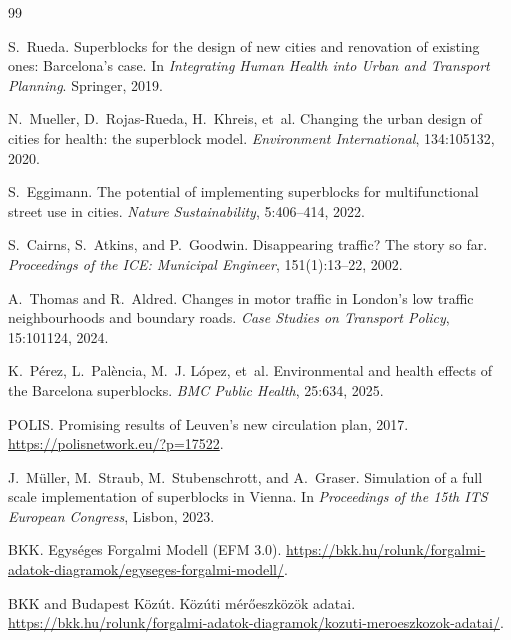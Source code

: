 \documentclass[11pt,a4paper]{article}
\begin{document}
\begin{thebibliography}{99}\small

S.~Rueda.
\newblock Superblocks for the design of new cities and renovation of existing ones: Barcelona's case.
\newblock In \emph{Integrating Human Health into Urban and Transport Planning}. Springer, 2019.

N.~Mueller, D.~Rojas-Rueda, H.~Khreis, et~al.
\newblock Changing the urban design of cities for health: the superblock model.
\newblock \emph{Environment International}, 134:105132, 2020.

S.~Eggimann.
\newblock The potential of implementing superblocks for multifunctional street use in cities.
\newblock \emph{Nature Sustainability}, 5:406--414, 2022.

S.~Cairns, S.~Atkins, and P.~Goodwin.
\newblock Disappearing traffic? {T}he story so far.
\newblock \emph{Proceedings of the ICE: Municipal Engineer}, 151(1):13--22, 2002.

A.~Thomas and R.~Aldred.
\newblock Changes in motor traffic in {L}ondon's low traffic neighbourhoods and boundary roads.
\newblock \emph{Case Studies on Transport Policy}, 15:101124, 2024.

K.~P{\'e}rez, L.~Pal{\`e}ncia, M.~J. L{\'o}pez, et~al.
\newblock Environmental and health effects of the {B}arcelona superblocks.
\newblock \emph{BMC Public Health}, 25:634, 2025.

POLIS.
\newblock Promising results of {L}euven's new circulation plan, 2017.
\newblock \url{https://polisnetwork.eu/?p=17522}.

J.~M{\"u}ller, M.~Straub, M.~Stubenschrott, and A.~Graser.
\newblock Simulation of a full scale implementation of superblocks in {V}ienna.
\newblock In \emph{Proceedings of the 15th ITS European Congress}, Lisbon, 2023.

BKK.
\newblock Egységes Forgalmi Modell (EFM 3.0).
\newblock \url{https://bkk.hu/rolunk/forgalmi-adatok-diagramok/egyseges-forgalmi-modell/}.

BKK and Budapest Közút.
\newblock Közúti mérőeszközök adatai.
\newblock \url{https://bkk.hu/rolunk/forgalmi-adatok-diagramok/kozuti-meroeszkozok-adatai/}.


\end{thebibliography}
\end{document}
